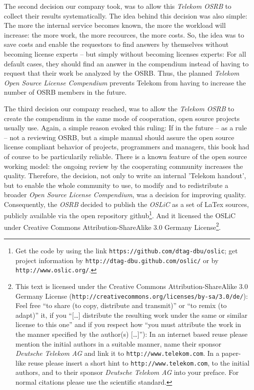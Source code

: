 The second decision our company took, was to allow this \emph{Telekom OSRB} to
collect their results systematically. The idea behind this decision was also
simple: The more the internal service becomes known, the more the workload will
increase: the more work, the more recources, the more costs. So, the idea was to
save costs and enable the requestors to find answers by themselves without
becoming license experts -- but simply without becoming licenses experts: For all
default cases, they should find an answer in the compendium instead of having to
request that their work be analyzed by the OSRB. Thus, the planned \emph{Telekom
Open Source License Compendium} prevents Telekom from having to increase the
number of OSRB members in the future.

The third decision our company reached, was to allow the \emph{Telekom OSRB} to
create the compendium in the same mode of cooperation, open source projects
usually use. Again, a simple reason evoked this ruling: If in the future
-- as a rule -- not a reviewing OSRB, but a simple manual should assure the open
source license compliant behavior of projects, programmers and managers, this
book had of course to be particularily reliable. There is a known feature of the
open source working model: the ongoing review by the cooperating community
increases the quality. Therefore, the decision, not only to write an internal
'Telekom handout', but to enable the whole community to use, to modify and to
redistribute a broader \emph{Open Source License Compendium}, was a decision for
improving quality. Consequently, the \emph{OSRB} decided to publish the
\emph{OSLiC} as a set of LaTex sources, publicly available via the open
repository github\footnote{Get the code by using the link
\texttt{https://github.com/dtag-dbu/oslic}; get project information by
\texttt{http://dtag-dbu.github.com/oslic/} or by
\texttt{http://www.oslic.org/}.}. And it licensed the OSLiC under Creative
Commons Attribution-ShareAlike 3.0 Germany License\footnote{ This text is
licensed under the Creative Commons Attribution-ShareAlike 3.0 Germany License
(\texttt{http://creativecommons.org/licenses/by-sa/3.0/de/}): Feel free
\enquote{to share (to copy, distribute and transmit)} or \enquote{to remix (to
adapt)} it, if you \enquote{[\ldots] distribute the resulting work under the
same or similar license to this one} and if you respect how \enquote{you must
attribute the work in the manner specified by the author(s) [\ldots]}):
In an internet based reuse please mention the initial authors in a suitable
manner, name their sponsor \textit{Deutsche Telekom AG} and link it to
\texttt{http://www.telekom.com}. In a paper-like reuse please insert a short
hint to \texttt{http://www.telekom.com}, to the initial authors, and to their
sponsor \textit{Deutsche Telekom AG} into your preface. For normal citations
please use the scientific standard.}.

